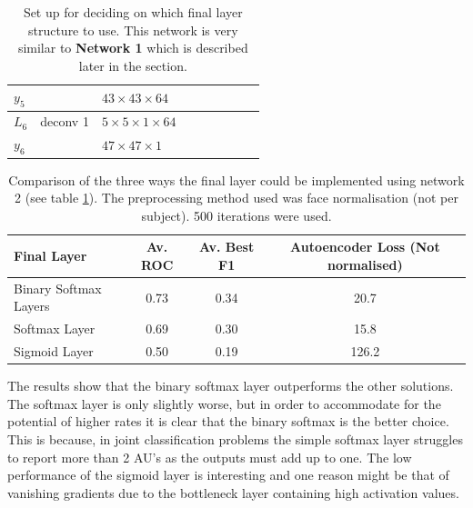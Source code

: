 \begin{table}[h!]
{\begin{tabular}{|lllllllll|}
    \multicolumn{1}{|l|}{$y_5$}   &          & \multicolumn{1}{l|}{$43\times43\times 64$}          &          & \multicolumn{1}{l|}{}          \\ \hline
    \multicolumn{1}{|l|}{$L_6$}   & deconv 1   & \multicolumn{1}{l|}{$5\times 5\times1\times 64$}  &          & \multicolumn{1}{l|}{}\\
    \multicolumn{1}{|l|}{$y_6$}   &          & \multicolumn{1}{l|}{$47\times47\times1$}            &          & \multicolumn{1}{l|}{}         \\ \hline
    \end{tabular}

    \caption{Set up for deciding on which final layer structure to use.
    This network is very similar to \textbf{Network 1} which is described later in the section.} \label{net:classcompnet}

    }
    \end{table}


    \begin{table}[!h] {\footnotesize
      \centering
      \begin{tabular}{lccc}
      \hline
      Final Layer   & Av. ROC &   Av. Best F1 &   Autoencoder Loss (Not normalised) \\
      \hline
      Binary Softmax Layers  &   0.73 &  0.34 &   20.7 \\
      Softmax Layer          &   0.69 &  0.30 &   15.8 \\
      Sigmoid Layer          &   0.50 &  0.19 &  126.2 \\
      \hline
      \end{tabular}
    \caption{Comparison of the three ways the final layer could be implemented using network 2 (see table \ref{net:classcompnet}). The
    preprocessing method used was face normalisation (not per subject). 500 iterations were used. } \label{tab:binsoftcomp} }
    \end{table}

    The results show that the binary softmax layer outperforms the other solutions. The
    softmax layer is only slightly worse, but in order to accommodate for the potential of higher rates
    it is clear that the binary softmax is the better choice. This is because, in joint classification problems
    the simple softmax layer struggles to report more than 2 AU's as the outputs must add up to one.
    The low performance of the sigmoid layer is interesting and one reason might be that of vanishing gradients due to
    the bottleneck layer containing high activation values.

